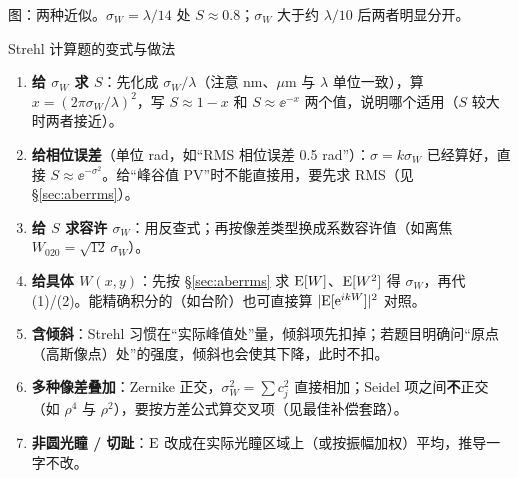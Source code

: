 \begin{center}

{\small 图：两种近似。$\sigma_W=\lambda/14$ 处 $S\approx0.8$；$\sigma_W$ 大于约 $\lambda/10$ 后两者明显分开。}
\end{center}

\begin{recipe}{Strehl 计算题的变式与做法}\label{rc:strehl-variants}
\begin{enumerate}
\item \textbf{给 $\sigma_W$ 求 $S$}：先化成 $\sigma_W/\lambda$（注意 nm、$\mu$m 与 $\lambda$ 单位一致），算 $x=(2\pi\sigma_W/\lambda)^2$，写 $S\approx1-x$ 和 $S\approx\ee^{-x}$ 两个值，说明哪个适用（$S$ 较大时两者接近）。
\item \textbf{给相位误差}（单位 rad，如“RMS 相位误差 0.5 rad”）：$\sigma=k\sigma_W$ 已经算好，直接 $S\approx\ee^{-\sigma^2}$。给“峰谷值 PV”时不能直接用，要先求 RMS（见 §\ref{sec:aberrms}）。
\item \textbf{给 $S$ 求容许 $\sigma_W$}：用反查式；再按像差类型换成系数容许值（如离焦 $W_{020}=\sqrt{12}\,\sigma_W$）。
\item \textbf{给具体 $W(x,y)$}：先按 §\ref{sec:aberrms} 求 $\mathrm{E}[W]$、$\mathrm{E}[W^2]$ 得 $\sigma_W$，再代 (1)/(2)。能精确积分的（如台阶）也可直接算 $|\mathrm{E}[\mathrm{e}^{ikW}]|^2$ 对照。
\item \textbf{含倾斜}：Strehl 习惯在“实际峰值处”量，倾斜项先扣掉；若题目明确问“原点（高斯像点）处”的强度，倾斜也会使其下降，此时不扣。
\item \textbf{多种像差叠加}：Zernike 正交，$\sigma_W^2=\sum c_j^2$ 直接相加；Seidel 项之间\textbf{不}正交（如 $\rho^4$ 与 $\rho^2$），要按方差公式算交叉项（见最佳补偿套路）。
\item \textbf{非圆光瞳 / 切趾}：$\mathrm{E}$ 改成在实际光瞳区域上（或按振幅加权）平均，推导一字不改。
\end{enumerate}
\end{recipe}

